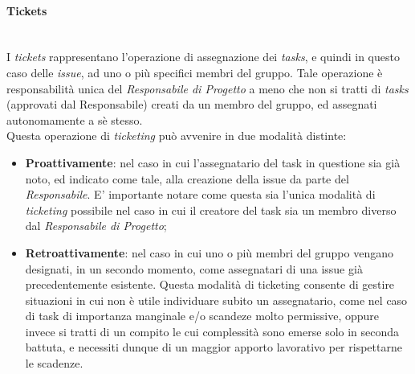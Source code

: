 \paragraph{Tickets} ~\\
	I \textit{tickets} rappresentano l'operazione di assegnazione dei \textit{tasks}, e quindi in questo caso delle \textit{issue}, ad uno o più specifici membri del gruppo. Tale operazione è responsabilità unica del \textit{Responsabile di Progetto} a meno che non si tratti di \textit{tasks} (approvati dal Responsabile) creati da un membro del gruppo, ed assegnati autonomamente a sè stesso.\\
	Questa operazione di \textit{ticketing} può avvenire in due modalità distinte:
	\begin{itemize}
	\item \textbf{Proattivamente}: nel caso in cui l'assegnatario del task in questione sia già noto, ed indicato come tale, alla creazione della issue da parte del \textit{Responsabile}. E' importante notare come questa sia l'unica modalità di \textit{ticketing} possibile nel caso in cui il creatore del task sia un membro diverso dal \textit{Responsabile di Progetto};
	\item \textbf{Retroattivamente}: nel caso in cui uno o più membri del gruppo vengano designati, in un secondo momento, come assegnatari di una issue già precedentemente esistente. Questa modalità di ticketing consente di gestire situazioni in cui non è utile individuare subito un assegnatario, come nel caso di task di importanza manginale e/o scandeze molto permissive, oppure invece si tratti di un compito le cui complessità sono emerse solo in seconda battuta, e necessiti dunque di un maggior apporto lavorativo per rispettarne le scadenze.
	\end{itemize}
